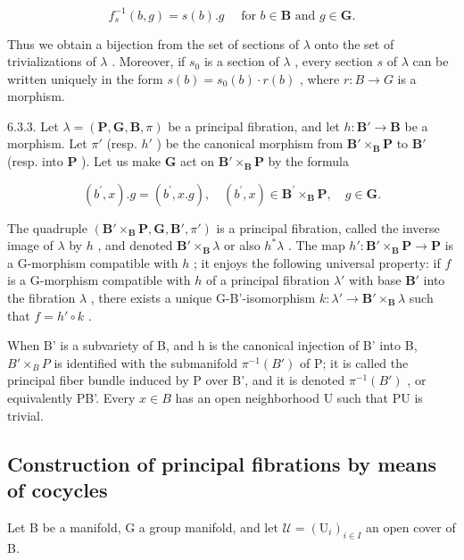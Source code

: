 \[
f _ {s} ^ {- 1} (b, g) = s (b). g \quad \text {   for   } b \in \mathbf {B} \text {   and   } g \in \mathbf {G}.
\]

Thus we obtain a bijection from the set of sections of \(\lambda\) onto the set of trivializations of \(\lambda\) . Moreover, if \(s_0\) is a section of \(\lambda\) , every section \(s\) of \(\lambda\) can be written uniquely in the form \(s(b) = s_0(b) \cdot r(b)\) , where \(r: B \to G\) is a morphism.

6.3.3. Let \(\lambda = (\mathbf{P}, \mathbf{G}, \mathbf{B}, \pi)\) be a principal fibration, and let \(h: \mathbf{B}' \to \mathbf{B}\) be a morphism. Let \(\pi'\) (resp. \(h'\) ) be the canonical morphism from \(\mathbf{B}' \times_{\mathbf{B}} \mathbf{P}\) to \(\mathbf{B}'\) (resp. into \(\mathbf{P}\) ). Let us make \(\mathbf{G}\) act on \(\mathbf{B}' \times_{\mathbf{B}} \mathbf{P}\) by the formula

\[
(b ^ {\prime}, x). g = (b ^ {\prime}, x. g), \quad (b ^ {\prime}, x) \in \mathbf {B} ^ {\prime} \times_ {\mathbf {B}} \mathbf {P}, \quad g \in \mathbf {G}.
\]

The quadruple \((\mathbf{B}' \times_{\mathbf{B}} \mathbf{P}, \mathbf{G}, \mathbf{B}', \pi')\) is a principal fibration, called the inverse image of \(\lambda\) by \(h\) , and denoted \(\mathbf{B}' \times_{\mathbf{B}} \lambda\) or also \(h^*\lambda\) . The map \(h': \mathbf{B}' \times_{\mathbf{B}} \mathbf{P} \to \mathbf{P}\) is a G-morphism compatible with \(h\) ; it enjoys the following universal property: if \(f\) is a G-morphism compatible with \(h\) of a principal fibration \(\lambda'\) with base \(\mathbf{B}'\) into the fibration \(\lambda\) , there exists a unique G-B'-isomorphism \(k: \lambda' \to \mathbf{B}' \times_{\mathbf{B}} \lambda\) such that \(f = h' \circ k\) .

When B' is a subvariety of B, and h is the canonical injection of B' into B, \(B' \times_{B} P\) is identified with the submanifold \(\pi^{-1}(B')\) of P; it is called the principal fiber bundle induced by P over B', and it is denoted \(\pi^{-1}(B')\) , or equivalently P\textbar B'. Every \(x \in B\) has an open neighborhood U such that P\textbar U is trivial.

\subsection{Construction of principal fibrations by means of cocycles}

Let B be a manifold, G a group manifold, and let \(\mathcal{U} = (\mathrm{U}_{i})_{i\in I}\) an open cover of B.

